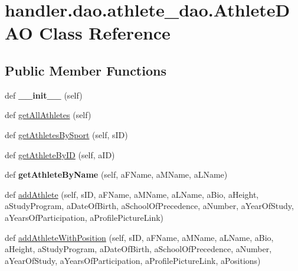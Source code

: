 \hypertarget{classhandler_1_1dao_1_1athlete__dao_1_1_athlete_d_a_o}{}\section{handler.\+dao.\+athlete\+\_\+dao.\+Athlete\+D\+AO Class Reference}
\label{classhandler_1_1dao_1_1athlete__dao_1_1_athlete_d_a_o}
\subsection*{Public Member Functions}
\begin{DoxyCompactItemize}
\item 
\mbox{\label{classhandler_1_1dao_1_1athlete__dao_1_1_athlete_d_a_o_a45e1d4d0fb1e1ab6327de53702dc1cc3}} 
def {\bfseries \+\_\+\+\_\+init\+\_\+\+\_\+} (self)
\item 
def \hyperlink{classhandler_1_1dao_1_1athlete__dao_1_1_athlete_d_a_o_a20c2fea97ed691d3c9459cb8bf13f962}{get\+All\+Athletes} (self)
\item 
def \hyperlink{classhandler_1_1dao_1_1athlete__dao_1_1_athlete_d_a_o_a03840784aabb2ecf6fd1117a999cc314}{get\+Athletes\+By\+Sport} (self, s\+ID)
\item 
def \hyperlink{classhandler_1_1dao_1_1athlete__dao_1_1_athlete_d_a_o_a0e7927503dbc9e594eab1b71ccfdcc71}{get\+Athlete\+By\+ID} (self, a\+ID)
\item 
\mbox{\label{classhandler_1_1dao_1_1athlete__dao_1_1_athlete_d_a_o_af6fe068ebb4a70311923168093b79610}} 
def {\bfseries get\+Athlete\+By\+Name} (self, a\+F\+Name, a\+M\+Name, a\+L\+Name)
\item 
def \hyperlink{classhandler_1_1dao_1_1athlete__dao_1_1_athlete_d_a_o_a8d63542ce2b12f1e736ad2dc718b07cd}{add\+Athlete} (self, s\+ID, a\+F\+Name, a\+M\+Name, a\+L\+Name, a\+Bio, a\+Height, a\+Study\+Program, a\+Date\+Of\+Birth, a\+School\+Of\+Precedence, a\+Number, a\+Year\+Of\+Study, a\+Years\+Of\+Participation, a\+Profile\+Picture\+Link)
\item 
def \hyperlink{classhandler_1_1dao_1_1athlete__dao_1_1_athlete_d_a_o_a1fe64fa924a8b61d35696786f259c17f}{add\+Athlete\+With\+Position} (self, s\+ID, a\+F\+Name, a\+M\+Name, a\+L\+Name, a\+Bio, a\+Height, a\+Study\+Program, a\+Date\+Of\+Birth, a\+School\+Of\+Precedence, a\+Number, a\+Year\+Of\+Study, a\+Years\+Of\+Participation, a\+Profile\+Picture\+Link, a\+Positions)

\end{DoxyCompactItemize}
